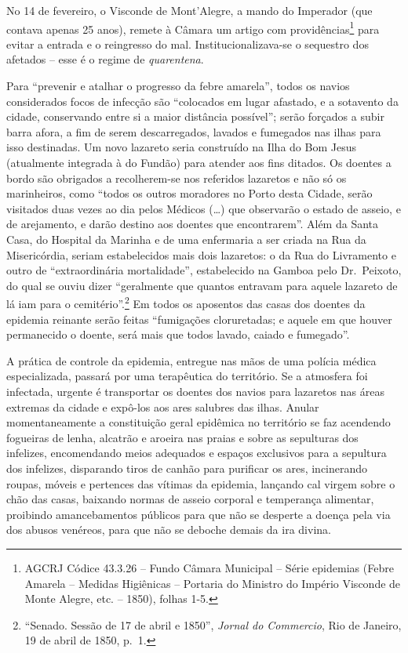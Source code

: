 No 14 de fevereiro, o Visconde de Mont'Alegre, a mando do Imperador (que
contava apenas 25 anos), remete à Câmara um artigo com
providências\footnote{AGCRJ Códice 43.3.26 -- Fundo Câmara Municipal --
  Série epidemias (Febre Amarela -- Medidas Higiênicas -- Portaria do
  Ministro do Império Visconde de Monte Alegre, etc. -- 1850), folhas
  1-5.} para evitar a entrada e o reingresso do mal.
Institucionalizava-se o sequestro dos afetados -- esse é o regime de
\emph{quarentena}.

Para ``prevenir e atalhar o progresso da febre amarela'', todos os
navios considerados focos de infecção são ``colocados em lugar afastado,
e a sotavento da cidade, conservando entre si a maior distância
possível''; serão forçados a subir barra afora, a fim de serem
descarregados, lavados e fumegados nas ilhas para isso destinadas. Um
novo lazareto seria construído na Ilha do Bom Jesus (atualmente
integrada à do Fundão) para atender aos fins ditados. Os doentes a bordo
são obrigados a recolherem-se nos referidos lazaretos e não só os
marinheiros, como ``todos os outros moradores no Porto desta Cidade,
serão visitados duas vezes ao dia pelos Médicos (\ldots{}) que
observarão o estado de asseio, e de arejamento, e darão destino aos
doentes que encontrarem''. Além da Santa Casa, do Hospital da Marinha e
de uma enfermaria a ser criada na Rua da Misericórdia, seriam
estabelecidos mais dois lazaretos: o da Rua do Livramento e outro de
``extraordinária mortalidade'', estabelecido na Gamboa pelo Dr.~Peixoto,
do qual se ouviu dizer ``geralmente que quantos entravam para aquele
lazareto de lá iam para o cemitério''.\footnote{``Senado. Sessão de 17
  de abril e 1850'', \emph{Jornal do Commercio}, Rio de Janeiro, 19 de
  abril de 1850, p.~1.} Em todos os aposentos das casas dos doentes da
epidemia reinante serão feitas ``fumigações cloruretadas; e aquele em
que houver permanecido o doente, será mais que todos lavado, caiado e
fumegado''.

A prática de controle da epidemia, entregue nas mãos de uma polícia
médica especializada, passará por uma terapêutica do território. Se a
atmosfera foi infectada, urgente é transportar os doentes dos navios
para lazaretos nas áreas extremas da cidade e expô-los aos ares salubres
das ilhas. Anular momentaneamente a constituição geral epidêmica no
território se faz acendendo fogueiras de lenha, alcatrão e aroeira nas
praias e sobre as sepulturas dos infelizes, encomendando meios adequados
e espaços exclusivos para a sepultura dos infelizes, disparando tiros de
canhão para purificar os ares, incinerando roupas, móveis e pertences
das vítimas da epidemia, lançando cal virgem sobre o chão das casas,
baixando normas de asseio corporal e temperança alimentar, proibindo
amancebamentos públicos para que não se desperte a doença pela via dos
abusos venéreos, para que não se deboche demais da ira divina.

